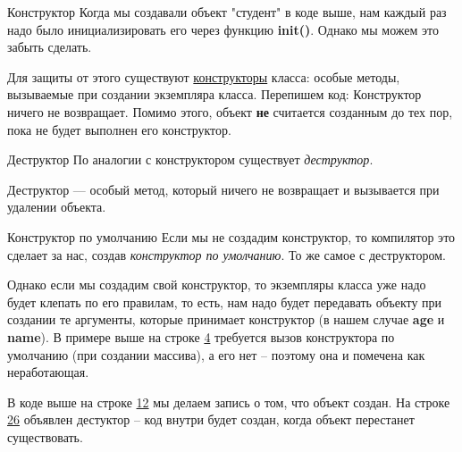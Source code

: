\begin{lecture}[\lectureSubject]
	\begin{lecSection}
		\begin{lecSubsection}{Конструктор}
		Когда мы создавали объект "студент" в коде выше, нам каждый раз надо было инициализировать его через функцию \textbf{init()}. Однако мы можем это забыть сделать.
		
		Для защиты от этого существуют \underline{конструкторы} класса: особые методы, вызываемые при создании экземпляра класса. Перепишем код:
		Конструктор ничего не возвращает. Помимо этого, объект \textbf{не} считается созданным до тех пор, пока не будет выполнен его конструктор.
		\end{lecSubsection}
		
		\begin{lecSubsection}{Деструктор}
		По аналогии с конструктором существует \textit{деструктор}.
		
		Деструктор --- особый метод, который ничего не возвращает и вызывается при удалении объекта.
		\end{lecSubsection}
		\begin{lecSubsection}{Конструктор по умолчанию}
			Если мы не создадим конструктор, то компилятор это сделает за нас, создав \textit{конструктор по умолчанию}. То же самое с деструктором.
			
			Однако если мы создадим свой конструктор, то экземпляры класса уже надо будет клепать по его правилам, то есть, нам надо будет передавать объекту при создании те аргументы, которые принимает конструктор (в нашем случае \textbf{age} и \textbf{name}).
			В примере выше на строке \underline{4} требуется вызов конструктора по умолчанию (при создании массива), а его нет -- поэтому она и помечена как неработающая.
			\newpage
		\end{lecSubsection}
		\begin{lecSection}
			В коде выше на строке \underline{12} мы делаем запись о том, что объект создан. На строке \underline{26} объявлен дестуктор -- код внутри будет создан, когда объект перестанет существовать.
			

\end{lecSection}
\end{lecSection}
\end{lecture}
